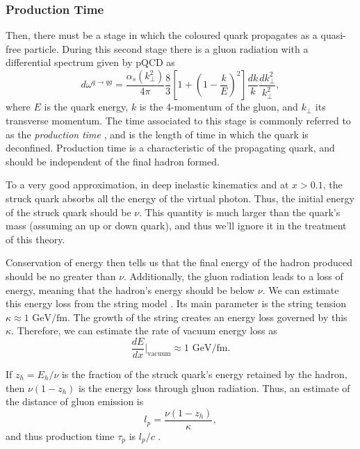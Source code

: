     \subsubsection{Production Time}
        Then, there must be a stage in which the coloured quark propagates as a quasi-free particle.
        During this second stage there is a gluon radiation with a differential spectrum given by pQCD as
        \begin{equation*}
            d\omega^{q \rightarrow qg} =
                    \frac{\alpha_s(k_\perp^2)}{4\pi}
                    \frac{8}{3}\left[ 1 + \left( 1 - \frac{k}{E} \right)^2 \right]
                    \frac{dk}{k} \frac{dk_\perp^2}{k_\perp^2},
        \end{equation*}
        where $E$ is the quark energy, $k$ is the 4-momentum of the gluon, and $k_\perp$ its transverse momentum.
        The time associated to this stage is commonly referred to as the \textit{production time} \cite{kopeliovich2004}, and is the length of time in which the quark is deconfined.
        Production time is a characteristic of the propagating quark, and should be independent of the final hadron formed.

        To a very good approximation, in deep inelastic kinematics and at $x > 0.1$, the struck quark absorbs all the energy of the virtual photon.
        Thus, the initial energy of the struck quark should be $\nu$.
        This quantity is much larger than the quark's mass (assuming an up or down quark), and thus we'll ignore it in the treatment of this theory.

        Conservation of energy then tells us that the final energy of the hadron produced should be no greater than $\nu$.
        Additionally, the gluon radiation leads to a loss of energy, meaning that the hadron's energy should be below $\nu$.
        We can estimate this energy loss from the string model \cite{artru1974}.
        Its main parameter is the string tension $\kappa \approx 1 \text{ GeV}/\text{fm}$.
        The growth of the string creates an energy loss governed by this $\kappa$.
        Therefore, we can estimate the rate of vacuum energy loss as
        \begin{equation*}
            \frac{dE}{dx}\Big|_\text{vacuum} \approx 1 \text{ GeV}/\text{fm}.
        \end{equation*}

        If $z_h = E_h/\nu$ is the fraction of the struck quark's energy retained by the hadron, then $\nu(1 - z_h)$ is the energy loss through gluon radiation.
        Thus, an estimate of the distance of gluon emission is
        \begin{equation*}
            l_p = \frac{\nu(1 - z_h)}{\kappa},
        \end{equation*}
        and thus production time $\tau_p$ is $l_p/c$ \cite{kopeliovich2004}.

